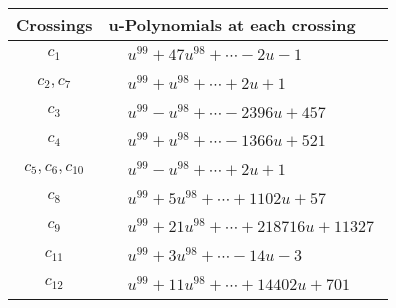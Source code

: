 \documentclass[1p]{elsarticle_modified}
\theoremstyle{definition}
\begin{document}
\begin{tabular}{m{50pt}|m{274pt}}
Crossings & \hspace{64pt}u-Polynomials at each crossing \\
\hline $$\begin{aligned}c_{1}\end{aligned}$$&$\begin{aligned}
&u^{99}+47 u^{98}+\cdots-2 u-1
\end{aligned}$\\
\hline $$\begin{aligned}c_{2},c_{7}\end{aligned}$$&$\begin{aligned}
&u^{99}+u^{98}+\cdots+2 u+1
\end{aligned}$\\
\hline $$\begin{aligned}c_{3}\end{aligned}$$&$\begin{aligned}
&u^{99}- u^{98}+\cdots-2396 u+457
\end{aligned}$\\
\hline $$\begin{aligned}c_{4}\end{aligned}$$&$\begin{aligned}
&u^{99}+u^{98}+\cdots-1366 u+521
\end{aligned}$\\
\hline $$\begin{aligned}c_{5},c_{6},c_{10}\end{aligned}$$&$\begin{aligned}
&u^{99}- u^{98}+\cdots+2 u+1
\end{aligned}$\\
\hline $$\begin{aligned}c_{8}\end{aligned}$$&$\begin{aligned}
&u^{99}+5 u^{98}+\cdots+1102 u+57
\end{aligned}$\\
\hline $$\begin{aligned}c_{9}\end{aligned}$$&$\begin{aligned}
&u^{99}+21 u^{98}+\cdots+218716 u+11327
\end{aligned}$\\
\hline $$\begin{aligned}c_{11}\end{aligned}$$&$\begin{aligned}
&u^{99}+3 u^{98}+\cdots-14 u-3
\end{aligned}$\\
\hline $$\begin{aligned}c_{12}\end{aligned}$$&$\begin{aligned}
&u^{99}+11 u^{98}+\cdots+14402 u+701
\end{aligned}$\\
\hline
\end{tabular}\newpage\renewcommand{\arraystretch}{1}
\end{document}
